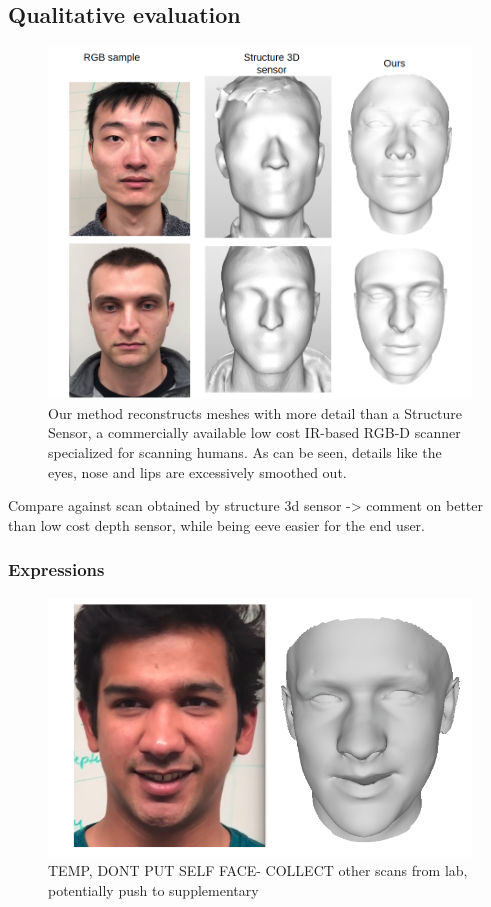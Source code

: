 \documentclass[10pt,twocolumn,letterpaper]{article}
\begin{document}
\subsection{Qualitative evaluation} \label{sec:qual}
\begin{figure}[t]
\begin{center}
   \includegraphics[width=0.9\linewidth]{images/struc_3d_comp.png}
\end{center}
   \caption{Our method reconstructs meshes with more detail than a Structure Sensor, a commercially available low cost IR-based RGB-D scanner \cite{structure2019} specialized for scanning humans. As can be seen, details like the eyes, nose and lips are excessively smoothed out.}
\label{fig:long}
\label{fig:onecol}
\end{figure}

Compare against scan obtained by structure 3d sensor -> comment on better than low cost depth sensor, while being eeve easier for the end user.

\subsubsection{Expressions}

 \begin{figure}[t]
\begin{center}
   \includegraphics[width=0.8\linewidth]{images/expression_dummy.png}
\end{center}
   \caption{ TEMP, DONT PUT SELF FACE- COLLECT other scans from lab, potentially push to supplementary }
\label{fig:expressions}
\end{figure}
\end{document}
